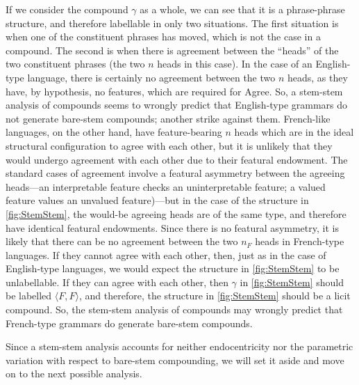 \documentclass[MilwayThesis]{subfiles}
\begin{document}
If we consider the compound $\gamma$ as a whole, we can see that it is a phrase-phrase structure, and therefore labellable in only two situations.
The first situation is when one of the constituent phrases has moved, which is not the case in a compound.
The second is when there is agreement between the ``heads'' of the two constituent phrases (the two $n$ heads in this case).
In the case of an English-type language, there is certainly no agreement between the two $n$ heads, as they have, by hypothesis, no features, which are required for Agree.
So, a stem-stem analysis of compounds seems to wrongly predict that English-type grammars do not generate bare-stem compounds; another strike against them.
French-like languages, on the other hand, have feature-bearing $n$ heads which are in the ideal structural configuration to agree with each other, but it is unlikely that they would undergo agreement with each other due to their featural endowment.
The standard cases of agreement involve a featural asymmetry between the agreeing heads---an interpretable feature checks an uninterpretable feature; a valued feature values an unvalued feature)---but in the case of the structure in \cref{fig:StemStem}, the would-be agreeing heads are of the same type, and therefore have identical featural endowments.
Since there is no featural asymmetry, it is likely that there can be no agreement between the two $n_{F}$ heads in French-type languages.
If they cannot agree with each other, then, just as in the case of English-type languages, we would expect the structure in \cref{fig:StemStem} to be unlabellable.
If they can agree with each other, then $\gamma$ in \cref{fig:StemStem} should be labelled $\langle F,F\rangle$, and therefore, the structure in \cref{fig:StemStem} should be a licit compound.
So, the stem-stem analysis of compounds may wrongly predict that French-type grammars do generate bare-stem compounds.

Since a stem-stem analysis accounts for neither endocentricity nor the parametric variation with respect to bare-stem compounding, we will set it aside and move on to the next possible analysis.
\end{document}
